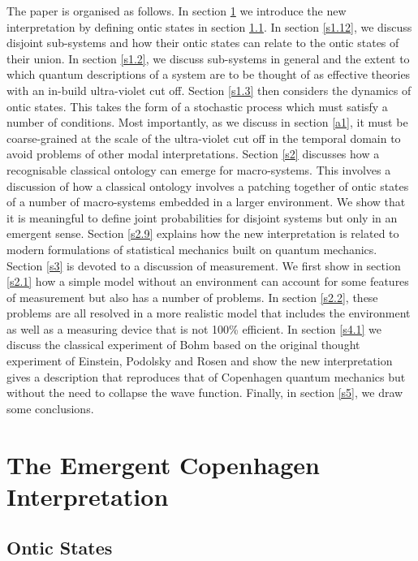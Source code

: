 \documentclass[%
preprint,
nofootinbib,
 amsmath,amssymb,
aps,
]{revtex4-1}
\begin{document}
The paper is organised as follows. In section \ref{s1.1} we introduce the new interpretation by defining ontic states in section \ref{s1.11}. In section \ref{s1.12}, we discuss disjoint sub-systems and how their ontic states can relate to the ontic states of their union. In section \ref{s1.2}, we discuss sub-systems in general and the extent to which quantum descriptions of a system are to be thought of as effective theories with an in-build ultra-violet cut off. Section \ref{s1.3} then considers the dynamics of ontic states. This takes the form of a stochastic process which must satisfy a number of conditions. Most importantly, as we discuss in section \ref{a1}, it must be coarse-grained at the scale of the ultra-violet cut off in the temporal domain to avoid problems of other modal interpretations. Section \ref{s2} discusses how a recognisable classical ontology can emerge for macro-systems. This involves a discussion of how a classical ontology involves a patching together of ontic states of a number of macro-systems embedded in a larger environment. We show that it is meaningful to define joint probabilities for disjoint systems but only in an emergent sense. Section \ref{s2.9} explains how the new interpretation is related to modern formulations of statistical mechanics built on quantum mechanics. Section \ref{s3} is devoted to a discussion of measurement. We first show in section \ref{s2.1} how a simple model without an environment can account for some features of measurement but also has a number of problems. In section \ref{s2.2}, these problems are all resolved in a more realistic model that includes the environment as well as a measuring device that is not 100\% efficient. In section \ref{s4.1} we discuss the classical experiment of Bohm based on the original thought experiment of Einstein, Podolsky and Rosen and show the new interpretation gives a description that reproduces that of Copenhagen quantum mechanics but without the need to collapse the wave function. Finally, in section \ref{s5}, we draw some conclusions.

\section{The Emergent Copenhagen Interpretation }\label{s1.1}

\subsection{Ontic States}\label{s1.11}
\end{document}

